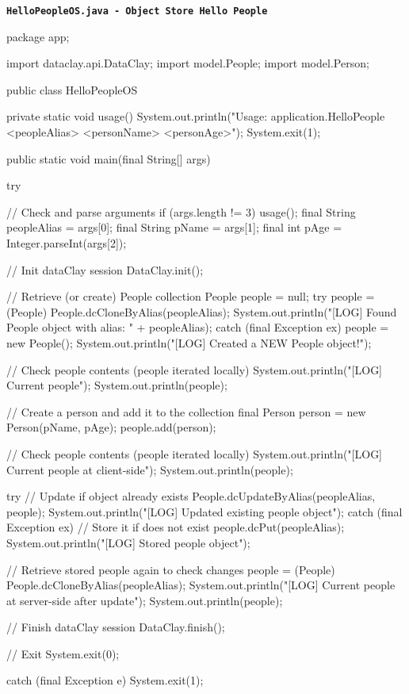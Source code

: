 \begin{tBox}
\texttt{\bfseries\textcolor{basecolor}{HelloPeopleOS.java - Object Store Hello People}}
\begin{java}
package app;

import dataclay.api.DataClay;
import model.People;
import model.Person;

public class HelloPeopleOS {
    private static void usage() {
        System.out.println("Usage: application.HelloPeople <peopleAlias> <personName> <personAge>");
        System.exit(1);
    }

    public static void main(final String[] args) {
        try {
            // Check and parse arguments
            if (args.length != 3) {
                    usage();
            }
            final String peopleAlias = args[0];
            final String pName = args[1];
            final int pAge = Integer.parseInt(args[2]);

            // Init dataClay session
            DataClay.init();

            // Retrieve (or create) People collection 
            People people = null;
            try {
                people = (People) People.dcCloneByAlias(peopleAlias);
                System.out.println("[LOG] Found People object with alias: " + peopleAlias);
            } catch (final Exception ex) {
                people = new People();
                System.out.println("[LOG] Created a NEW People object!");
            }

            // Check people contents (people iterated locally)
            System.out.println("[LOG] Current people");
            System.out.println(people);

            // Create a person and add it to the collection
            final Person person = new Person(pName, pAge);
            people.add(person);

            // Check people contents (people iterated locally)
            System.out.println("[LOG] Current people at client-side");
            System.out.println(people);

            try {
                // Update if object already exists
                People.dcUpdateByAlias(peopleAlias, people);
                System.out.println("[LOG] Updated existing people object");
            } catch (final Exception ex) {
                // Store it if does not exist
                people.dcPut(peopleAlias);
                System.out.println("[LOG] Stored people object");
            }

            // Retrieve stored people again to check changes
            people = (People) People.dcCloneByAlias(peopleAlias);
            System.out.println("[LOG] Current people at server-side after update");
            System.out.println(people);

            // Finish dataClay session
            DataClay.finish();

            // Exit
            System.exit(0);
        } catch (final Exception e) {
            System.exit(1);
        }
    }
}

\end{java}
\end{tBox}

